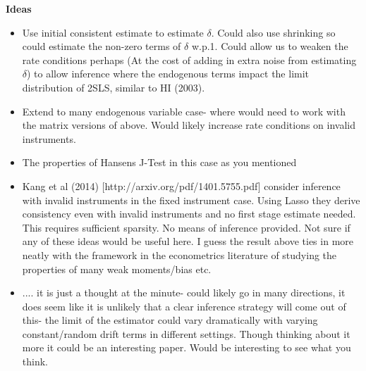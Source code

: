 \documentclass[11pt, fleqn]{article}
\begin{document}
\textbf{Ideas}
\begin{itemize}
  \item Use initial consistent estimate to estimate $\delta$. Could also use shrinking so could estimate the non-zero terms of $\delta$ w.p.1. Could allow us to weaken the rate conditions perhaps (At the cost of adding in extra noise from estimating $\delta$) to allow inference where the endogenous terms impact the limit distribution of 2SLS, similar to HI (2003).
  \item Extend to many endogenous variable case- where would need to work with the matrix versions of above. Would likely increase rate conditions on invalid instruments.
  \item The properties of Hansens J-Test in this case as you mentioned
  \item Kang et al (2014) [http://arxiv.org/pdf/1401.5755.pdf] consider inference with invalid instruments in the fixed instrument case. Using Lasso they derive consistency even with invalid instruments and no first stage estimate needed. This requires sufficient sparsity. No  means of inference provided. Not sure if any of these ideas would be useful here. I guess the result above ties in more neatly with the  framework in the econometrics literature of studying the properties of many weak moments/bias etc.
  \item ....  it is just a thought at the minute- could likely go in many directions, it does seem like it is unlikely that a clear inference strategy will come out of this- the limit of the estimator could vary dramatically with varying constant/random drift terms in different settings. Though thinking about it more it could be an interesting paper. Would be interesting to see what you think. 

\end{itemize}
\end{document}
